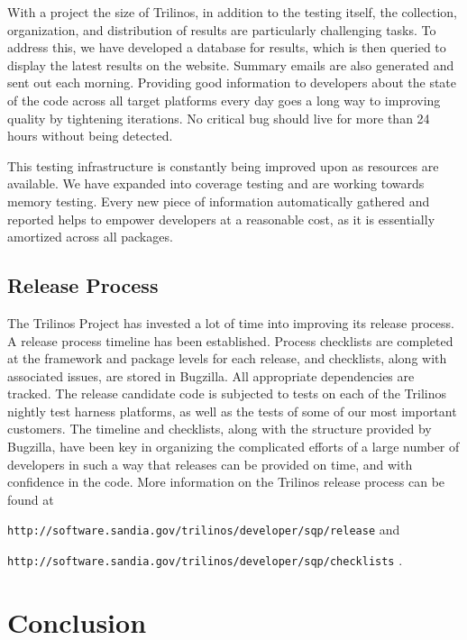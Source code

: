 \documentclass[12pt,relax]{article}
\newcommand{\InlineDirectory}[1]{
  {\hspace{0.01 in}} {\tt #1} {\hspace{0.01 in}}}
\begin{document}
With a project the size of Trilinos, in addition to the testing itself, the
collection, organization, and distribution of results are particularly
challenging tasks.  To address this, we have developed a database for results,
which is then queried to display the latest results on the website.  Summary
emails are also generated and sent out each morning.  Providing good
information to developers about the state of the code across all target
platforms every day goes a long way to improving quality by tightening
iterations.  No critical bug should live for more than 24 hours without being 
detected.

This testing infrastructure is constantly being improved upon as resources are
available.  We have expanded into coverage testing and are working towards
memory testing.  Every new piece of information automatically gathered and
reported helps to empower developers at a reasonable cost, as it is essentially
amortized across all packages.

\subsection{Release Process}

The Trilinos Project has invested a lot of time into improving its release
process.  A release process timeline has been established.  Process 
checklists are completed at the framework and package levels for each release,
and checklists, along with associated issues, are stored in Bugzilla.  All
appropriate dependencies are tracked.  The release candidate code is subjected
to tests on each of the Trilinos nightly test harness platforms, as well as the
tests of some of our most important customers.  The timeline and checklists,
along with the structure provided by Bugzilla, have been key in organizing the
complicated efforts of a large number of developers in such a way that releases
can be provided on time, and with confidence in the code.  More information on
the Trilinos release process can be found at \newline
\InlineDirectory{http://software.sandia.gov/trilinos/developer/sqp/release} 
and \newline
\InlineDirectory{http://software.sandia.gov/trilinos/developer/sqp/checklists}.



\section{Conclusion}
\label{Section:Conclusion}
\end{document}
